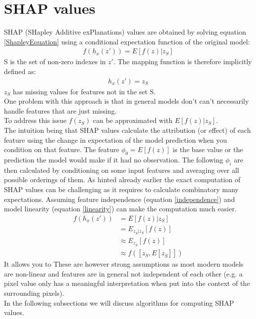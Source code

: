 \documentclass[conference]{IEEEtran}
\begin{document}
\section{SHAP values}
\label{SHAP}
SHAP (SHapley Additive exPlanations) values \cite{b2} are obtained by solving equation \ref{ShapleyEquation} using a conditional expectation function of the original model:
\begin{align}
f(h_x(z')) = E[f(z) | z_S]
\end{align}
S is the set of non-zero indexes in $z'$. 
The mapping function is therefore implicitly defined as:\\
\begin{align}
h_x(z') = z_S
\end{align}
$z_S$ has missing values for features not in the set S.\\
One problem with this approach is that in general models don't can't necessarily handle features that are just missing.\\
To address this issue $f(z_S)$ can be approximated with $E[f(z)| z_S].$\\
The intuition being that SHAP values  calculate the attribution (or effect) of each feature using the change in expectation of the model prediction when you condition on that feature. 
The feature $\phi_0 = E[f(z)]$ is the base value or the prediction the model would make if it had no observation. 
The following $\phi_i$ are then calculated by conditioning on some input features and averaging over all possible orderings of them.
As hinted already earlier the exact computation of SHAP values can be challenging as it requires to calculate combinatory many expectations. 
Assuming feature independence (equation \ref{independence}) and model linearity (equation \ref{linearity}) can make the computation much easier. 
\begin{align}
f(h_x(z')) &= E[f(z)|z_{S}]\\
&= E_{z_{\overline{S}}|z_S}[f(z)]\\
&\approx E_{z_{\overline{S}}}[f(z)] \label{independence}\\ 
&\approx f([z_S, E[z_{\overline{S}}]])  \label{linearity}
\end{align}
It allows you to 
These are however strong assumptions as most modern models are non-linear and features are in general not independent of each other (e.g. a pixel value only has a meaningful interpretation when put into the context of the surrounding pixels).\\
In the following subsections we will discuss algorithms for computing SHAP values.
\end{document}
